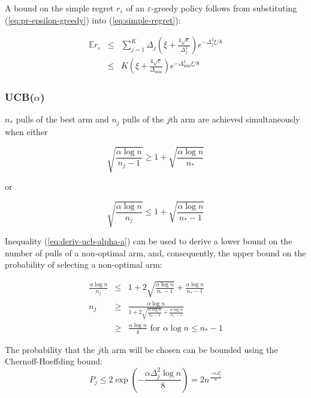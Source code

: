 \documentclass{article}
\newcommand {\IE} {\ensuremath {\mathbb{E}}}
\begin{document}
A bound on the simple regret $r_\varepsilon$ of an
$\varepsilon$-greedy policy follows from substituting
(\ref{eq:pr-epsilon-greedy}) into (\ref{eq:simple-regret}):

\begin{eqnarray}
  \IE r_\varepsilon&\le&\sum_{j=1}^K\Delta_j\left(\xi + \frac {4\sqrt e}
{\Delta_j^2}\right)e^{-\Delta_j^2\xi/8}\nonumber\\
&\le&K\left(\xi + \frac {4\sqrt
    e}{\Delta_{\min}}\right)e^{-\Delta_{\min}^2\xi/8}
\label{eq:deriv-epsilon-greedy-b}
\end{eqnarray}

\subsubsection{UCB($\alpha$)}
\label{app:derivations-finite-ucb}

$n_*$ pulls of the best arm and $n_j$ pulls of the $j$th arm are
achieved simultaneously when either 


\begin{equation}
\sqrt {\frac {\alpha \log n} {n_j-1}} \ge 1 + \sqrt { \frac {\alpha \log n} {n_*}}
\end{equation}

or

\begin{equation}
\sqrt {\frac {\alpha \log n} {n_j}} \le 1 + \sqrt { \frac {\alpha \log n} {n_* - 1}}
\label{eq:deriv-ucb-alpha-a}
\end{equation}

Inequality (\ref{eq:deriv-ucb-alpha-a}) can be used to derive a lower
bound on the number of pulls of a non-optimal arm,  and, consequently, the upper
bound on the probability of selecting a non-optimal arm:

\begin{eqnarray}
\frac {\alpha \log n} {n_j}&\le& 1 + 2  \sqrt {\frac {\alpha \log n}
  {n_*-1}} + \frac {\alpha \log n} {n_*-1}\nonumber\\
n_j &\ge& \frac {\alpha \log n} {1+2 \sqrt {\frac {\alpha \log n}
    {n_*-1}} + \frac {\alpha \log n} {n_*-1}}\nonumber\\
    &\ge& \frac {\alpha \log n} {4} \mbox{ for } \alpha \log n \le n_*-1
\end{eqnarray}

The probability that the $j$th arm will be chosen can be bounded using
the Chernoff-Hoeffding bound:
\begin{equation}
P_j \le 2 \exp\left(-\frac {\alpha \Delta_j^2 \log n} 8 \right) = 2n^{\frac {-\alpha \Delta_j^2} 8}
\end{equation}
\end{document}

